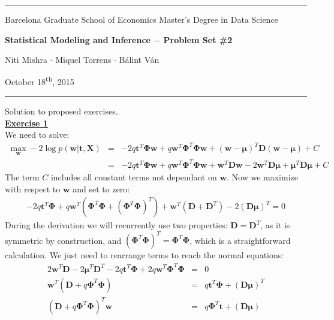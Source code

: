 \documentclass[a4paper, 11pt]{article}
\newcommand{\header}[4]{
	\begin{center}
		\rule{\linewidth}{0.5pt}
		
		{\small{#1}}
      
        \vspace{0.2in}
        
		{\large{#2}}
		
        \vspace{0.2in}
        
		{\small{#3}}
		
		\vspace{0.15in}
		
		{#4}
		
		\vspace{-0.1in}
		\rule{\linewidth}{0.6pt}
	\end{center}
}
\begin{document}

 
\header{\sc Barcelona Graduate School of Economics \hfill Master's Degree in Data Science}{\bf Statistical Modeling and Inference $-$ Problem Set \#2}{\sc Niti Mishra $\cdot$ Miquel Torrens $\cdot$ B\'alint V\'an}{October 18\textsuperscript{th}, 2015}
Solution to proposed exercises.\\
\newline \textbf{\underline{Exercise 1}}\\
\newline We need to solve:
\begin{eqnarray}
\max_{\mathbf{w}} -2 \log p(\mathbf{w | t, X}) &=&  -2q \mathbf{t}^T \mathbf{\Phi w} + q \mathbf{w}^T \mathbf{\Phi}^T \mathbf{\Phi w} + (\mathbf{w - \mu})^T \mathbf{D} (\mathbf{w - \mu}) + C \nonumber \\
&=&  -2q \mathbf{t}^T \mathbf{\Phi w} + q \mathbf{w}^T \mathbf{\Phi}^T \mathbf{\Phi w} + \mathbf{w}^T \mathbf{D w} - 2 \mathbf{w}^T \mathbf{D} \mathbf{\mu} + \mathbf{\mu}^T \mathbf{D \mu} + C \nonumber
\end{eqnarray}
The term $C$ includes all constant terms not dependant on $\mathbf{w}$. Now we maximize with respect to $\mathbf{w}$ and set to zero:
\begin{eqnarray}
-2q \mathbf{t}^T \mathbf{\Phi} + q \mathbf{w}^T \left(\mathbf{\Phi}^T \mathbf{\Phi} + \left( \mathbf{\Phi}^T \mathbf{\Phi} \right)^T \right) + \mathbf{w}^T \left( \mathbf{D} + \mathbf{D}^T \right) - 2 \left( \mathbf{D} \mathbf{\mu} \right)^T = 0 \nonumber
\end{eqnarray}
During the derivation we will recurrently use two properties: $\mathbf{D} = \mathbf{D}^T$, as it is symmetric by construction, and $\left( \mathbf{\Phi}^T \mathbf{\Phi} \right)^T = \mathbf{\Phi}^T \mathbf{\Phi}$, which is a straightforward calculation. We just need to rearrange terms to reach the normal equations:
\begin{eqnarray}
2 \mathbf{w}^T\mathbf{D} -2 \mathbf{\mu}^T \mathbf{D}^T -2 q \mathbf{t}^T \mathbf{\Phi} + 2q\mathbf{w}^T \mathbf{\Phi}^T \mathbf{\Phi} &=& 0 \nonumber \\
\mathbf{w}^T \left( \mathbf{D} + q \mathbf{\Phi}^T \mathbf{\Phi} \right) &=& q\mathbf{t}^T \mathbf{\Phi} + \left( \mathbf{D\mu} \right)^T  \nonumber \\
\left( \mathbf{D} + q \mathbf{\Phi}^T \mathbf{\Phi} \right)^T \mathbf{w} &=& q\mathbf{\Phi}^T \mathbf{t} + \left( \mathbf{D\mu} \right) \nonumber
\end{eqnarray}
\end{document}

